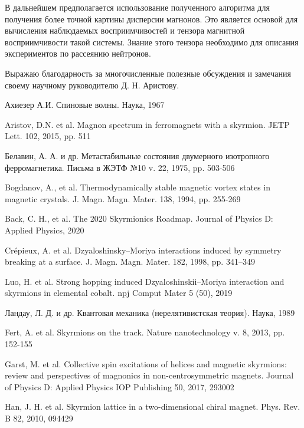 \documentclass[a4paper,article,14pt]{extarticle}
\begin{document}
В дальнейшем предполагается использование полученного алгоритма для получения более точной картины дисперсии магнонов. Это является основой для вычисления наблюдаемых восприимчивостей и тензора магнитной восприимчивости такой системы. Знание этого тензора необходимо для описания экспериментов по рассеянию нейтронов.

Выражаю благодарность за многочисленные полезные обсуждения и замечания своему научному руководителю Д. Н. Аристову.


\pagebreak
\begin{thebibliography}{1}
 Ахиезер А.И. \flqq Спиновые волны\frqq. Наука, 1967

 Aristov, D.N. et al. \flqq Magnon spectrum in ferromagnets with a skyrmion\frqq. JETP Lett. 102, 2015, pp. 511

 Белавин, А. А. и др. \flqq Метастабильные состояния двумерного изотропного ферромагнетика\frqq. Письма в ЖЭТФ №10 v. 22, 1975, pp. 503-506

 Bogdanov, A., et al. \flqq Thermodynamically stable magnetic vortex states in magnetic crystals\frqq. J. Magn. Magn. Mater. 138, 1994, pp. 255-269
 
 Back, C. H., et al.  \flqq The 2020 Skyrmionics Roadmap\frqq. Journal of Physics D: Applied Physics, 2020

 Crépieux, A. et al. \flqq Dzyaloshinsky–Moriya interactions induced by symmetry breaking at a surface\frqq.  J. Magn. Magn. Mater. 182, 1998, pp. 341–349

 Luo, H. et al. \flqq Strong hopping induced Dzyaloshinskii–Moriya interaction and skyrmions in elemental cobalt\frqq. npj Comput Mater 5 (50), 2019

 Ландау, Л. Д. и др. \flqq Квантовая механика (нерелятивистская теория)\frqq. Наука, 1989

 Fert, A. et al. \flqq Skyrmions on the track\frqq. Nature nanotechnology v. 8, 2013, pp. 152-155

 Garst, M. et al. \flqq Collective spin excitations of helices and magnetic skyrmions: review and perspectives of magnonics in non-centrosymmetric magnets\frqq. Journal of Physics D: Applied Physics IOP Publishing 50, 2017, 293002

 Han, J. H. et al. \flqq Skyrmion lattice in a two-dimensional chiral magnet\frqq. Phys. Rev. B 82, 2010, 094429


\end{thebibliography}
\end{document}

